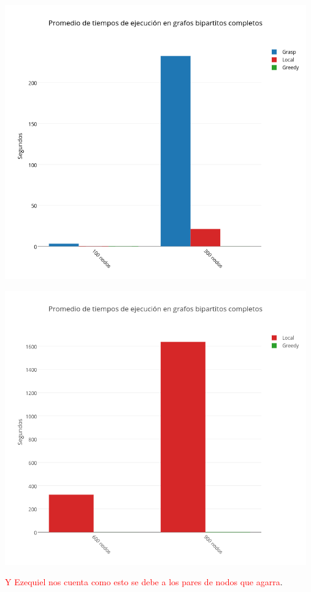 \begin{center}
 	\includegraphics[width=13cm, keepaspectratio=yes]{imagenes/coliseo/Bipartite1.png}

 	\includegraphics[width=13cm, keepaspectratio=yes]{imagenes/coliseo/Bipartite2.png}
\end{center}

\textcolor{red}{Y Ezequiel nos cuenta como esto se debe a los pares de nodos que agarra}.

